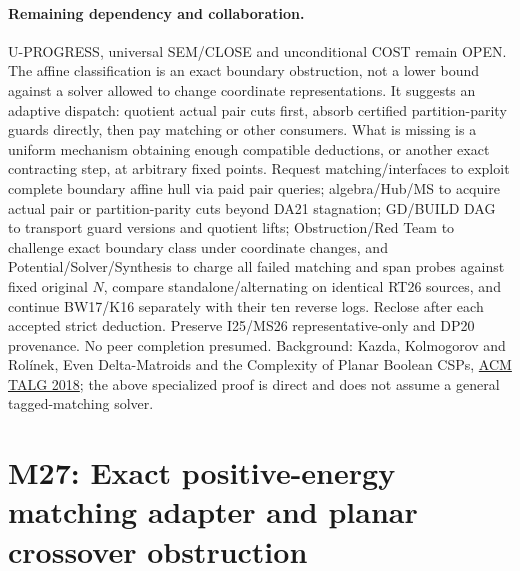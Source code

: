 \documentclass[11pt]{article}
\begin{document}
\paragraph{Remaining dependency and collaboration.} U-PROGRESS, universal SEM/CLOSE and unconditional COST remain OPEN. The affine classification is an exact boundary obstruction, not a lower bound against a solver allowed to change coordinate representations. It suggests an adaptive dispatch: quotient actual pair cuts first, absorb certified partition-parity guards directly, then pay matching or other consumers. What is missing is a uniform mechanism obtaining enough compatible deductions, or another exact contracting step, at arbitrary fixed points. Request matching/interfaces to exploit complete boundary affine hull via paid pair queries; algebra/Hub/MS to acquire actual pair or partition-parity cuts beyond DA21 stagnation; GD/BUILD DAG to transport guard versions and quotient lifts; Obstruction/Red Team to challenge exact boundary class under coordinate changes, and Potential/Solver/Synthesis to charge all failed matching and span probes against fixed original $N$, compare standalone/alternating on identical RT26 sources, and continue BW17/K16 separately with their ten reverse logs. Reclose after each accepted strict deduction. Preserve I25/MS26 representative-only and DP20 provenance. No peer completion presumed. Background: Kazda, Kolmogorov and Rol\'inek, Even Delta-Matroids and the Complexity of Planar Boolean CSPs, \href{https://doi.org/10.1145/3230649}{ACM TALG 2018}; the above specialized proof is direct and does not assume a general tagged-matching solver.


\section{M27: Exact positive-energy matching adapter and planar crossover obstruction}\label{sec:m27}
\end{document}
